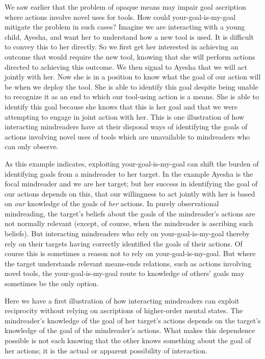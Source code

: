 \documentclass[12pt,\papersize]{extarticle}
\begin{document}
We saw earlier that the problem of opaque means  may impair goal ascription where actions involve novel uses for tools.
How could your-goal-is-my-goal mitigate the problem in such cases?
Imagine we are interacting with a young child,
Ayesha,
and want her to understand how a new tool is used.  
It is difficult to convey this to her directly.  
So we first get her interested in achieving an outcome that would require the new tool,
knowing that she will perform actions directed to achieving this outcome.  
We then signal to Ayesha that we will act jointly with her.  
Now she is in a position to know what the goal of our action will be when we deploy the tool.  
She is able to identify this goal 
despite being unable to recognize it as an end to which our tool-using action is a means.
She is able to identify this goal 
because she knows that this is her goal
and that we were attempting to engage in joint action with her.
This is one illustration of how 
interacting mindreaders have at their disposal ways of
identifying the goals of actions involving novel uses of tools
which are unavailable to mindreaders who can only observe.


As this example indicates,
exploiting your-goal-is-my-goal 
can shift the burden of identifying goals from a mindreader to her target.
In the example Ayesha is the focal mindreader and we are her target;
but her success in identifying the goal of our actions
depends on this,
that our willingness to act jointly with her is based on \emph{our} knowledge of the goals of \emph{her} actions.
In purely observational mindreading, the target's beliefs about the goals of the mindreader's actions are not normally relevant (except, of course, when the mindreader is ascribing such beliefs).
But interacting mindreaders who rely on your-goal-is-my-goal
thereby rely on their targets having correctly identified the goals of their actions.
Of course this is sometimes a reason not to rely on your-goal-is-my-goal.
But where the target understands relevant means-ends relations,
such as actions involving novel tools,
the your-goal-is-my-goal route to knowledge of others' goals may sometimes be the only option.

Here we have a first illustration of how
interacting mindreaders can exploit reciprocity 
without relying on ascriptions of higher-order mental states.
The mindreader's knowledge of the goal of her target's actions depends on the target's knowledge of the goal of the mindreader's actions.
What makes this dependence possible is not each knowing that the other knows something about the goal of her actions;
 it is  the actual or apparent  possibility of interaction.
\end{document}
